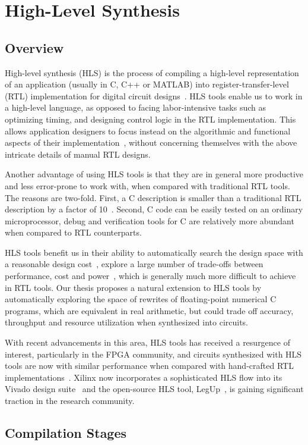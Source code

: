 \section{High-Level Synthesis}
\label{bg:sec:high_level_synthesis}

\subsection{Overview}
\label{bg:sub:hls_overview}

High-level synthesis (HLS) is the process of compiling a high-level
representation of an application (usually in C, C++ or MATLAB) into
register-transfer-level (RTL) implementation for digital circuit
designs~\cite{coussy, gajski}.  HLS tools enable us to work in a high-level
language, as opposed to facing labor-intensive tasks such as optimizing timing,
and designing control logic in the RTL implementation. This allows application
designers to focus instead on the algorithmic and functional aspects of their
implementation~\cite{coussy}, without concerning themselves with the above
intricate details of manual RTL designs.

Another advantage of using HLS tools is that they are in general more
productive and less error-prone to work with, when compared with traditional
RTL tools.  The reasons are two-fold.  First, a C description is smaller than a
traditional RTL description by a factor of 10~\cite{coussy, bdti}.  Second, C
code can be easily tested on an ordinary microprocessor, debug and verification
tools for C are relatively more abundant when compared to RTL counterparts.

HLS tools benefit us in their ability to automatically search the design
space with a reasonable design cost~\cite{bdti}, explore a large number of
trade-offs between performance, cost and power~\cite{mcfarland}, which is
generally much more difficult to achieve in RTL tools.  Our thesis proposes
a natural extension to HLS tools by automatically exploring the space of
rewrites of floating-point numerical C programs, which are equivalent in real
arithmetic, but could trade off accuracy, throughput and resource utilization
when synthesized into circuits.

With recent advancements in this area, HLS tools has received a resurgence of
interest, particularly in the FPGA community, and circuits synthesized with
HLS tools are now with similar performance when compared with hand-crafted RTL
implementations~\cite{bdti}.  Xilinx now incorporates a sophisticated HLS flow
into its Vivado design suite~\cite{vivado_hls} and the open-source HLS tool,
LegUp~\cite{legup}, is gaining significant traction in the research community.


\subsection{Compilation Stages}
\label{bg:sub:compilation_stages}


